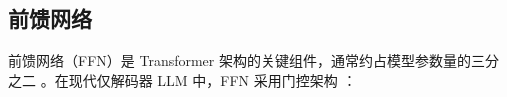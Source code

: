 \documentclass[11pt]{article}
\begin{document}


    
    



\subsection{前馈网络}

前馈网络（FFN）是 Transformer 架构的关键组件，通常约占模型参数量的三分之二 \cite{geva2021ffnmemory}。在现代仅解码器 LLM 中，FFN 采用门控架构 \cite{shazeer2020glu}：
\end{document}
